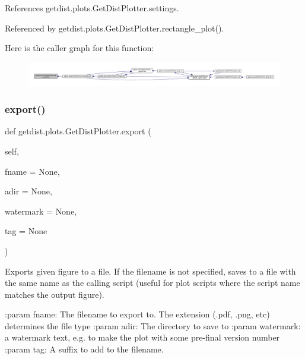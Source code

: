 References getdist.\+plots.\+Get\+Dist\+Plotter.\+settings.



Referenced by getdist.\+plots.\+Get\+Dist\+Plotter.\+rectangle\+\_\+plot().

Here is the caller graph for this function\+:
\nopagebreak
\begin{figure}[H]
\begin{center}
\leavevmode
\includegraphics[width=350pt]{classgetdist_1_1plots_1_1GetDistPlotter_a5839922c9cf43552f633678119f6f6de_icgraph}
\end{center}
\end{figure}
\mbox{\label{classgetdist_1_1plots_1_1GetDistPlotter_ab620b89a8337904ff357c316f040aa53}} 
\subsubsection{\texorpdfstring{export()}{export()}}
{\footnotesize\ttfamily def getdist.\+plots.\+Get\+Dist\+Plotter.\+export (\begin{DoxyParamCaption}\item[{}]{self,  }\item[{}]{fname = {\ttfamily None},  }\item[{}]{adir = {\ttfamily None},  }\item[{}]{watermark = {\ttfamily None},  }\item[{}]{tag = {\ttfamily None} }\end{DoxyParamCaption})}

\begin{DoxyVerb}Exports given figure to a file. If the filename is not specified, saves to a file with the same
name as the calling script (useful for plot scripts where the script name matches the output figure).

:param fname: The filename to export to. The extension (.pdf, .png, etc) determines the file type
:param adir: The directory to save to
:param watermark: a watermark text, e.g. to make the plot with some pre-final version number
:param tag: A suffix to add to the filename.
\end{DoxyVerb}
 

